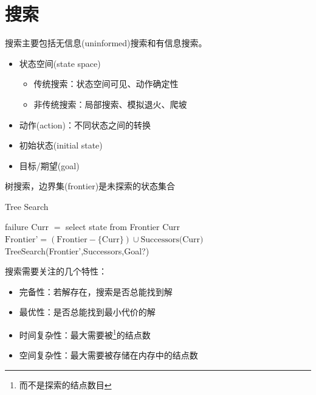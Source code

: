 
\section{搜索}

搜索主要包括无信息(uninformed)搜索和有信息搜索。
\begin{itemize}
	\item 状态空间(state space)
	\begin{itemize}
		\item 传统搜索：状态空间可见、动作确定性
		\item 非传统搜索：局部搜索、模拟退火、爬坡
	\end{itemize}
	\item 动作(action)：不同状态之间的转换
	\item 初始状态(initial state)
	\item 目标/期望(goal)
\end{itemize}

树搜索，边界集(frontier)是未探索的状态集合
\begin{algorithm}[H]
\caption{Tree Search}
\begin{algorithmic}[1]
\State \Return failure
\EndIf
\State Curr $=$ select state from Frontier
\State \Return Curr
\EndIf
\State $\text{Frontier'} = (\text{Frontier} - \{\text{Curr}\}) \cup \text{Successors(Curr)}$
\State \Return TreeSearch(Frontier',Successors,Goal?)
\EndProcedure
\end{algorithmic}
\end{algorithm}

搜索需要关注的几个特性：
\begin{itemize}
	\item 完备性：若解存在，搜索是否总能找到解
	\item 最优性：是否总能找到最小代价的解
	\item 时间复杂性：最大需要被\footnote{而不是探索的结点数目}的结点数
	\item 空间复杂性：最大需要被存储在内存中的结点数
\end{itemize}

